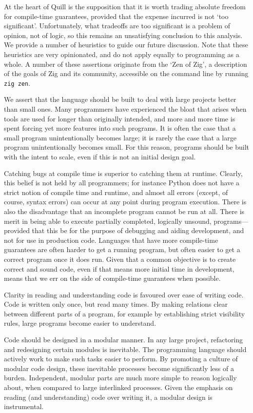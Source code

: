 \documentclass[UKenglish, 11pt, a4paper, parskip=half]{scrbook}
\newcommand{\code}[1]{\lstinline{#1}}
\theoremstyle{definition}
\begin{document}
At the heart of Quill is the supposition that it is worth trading absolute freedom for compile-time guarantees, provided that the expense incurred is not `too significant'.
Unfortunately, what tradeoffs are too significant is a problem of opinion, not of logic, so this remains an unsatisfying conclusion to this analysis.
We provide a number of heuristics to guide our future discussion.
Note that these heuristics are very opinionated, and do not apply equally to programming as a whole.
A number of these assertions originate from the `Zen of Zig', a description of the goals of Zig and its community, accessible on the command line by running \code{zig zen}.

We assert that the language should be built to deal with large projects better than small ones.
Many programmers have experienced the bloat that arises when tools are used for longer than originally intended, and more and more time is spent forcing yet more features into such programs.
It is often the case that a small program unintentionally becomes large; it is rarely the case that a large program unintentionally becomes small.
For this reason, programs should be built with the intent to scale, even if this is not an initial design goal.

Catching bugs at compile time is superior to catching them at runtime.
Clearly, this belief is not held by all programmers; for instance Python does not have a strict notion of compile time and runtime, and almost all errors (except, of course, syntax errors) can occur at any point during program execution.
There is also the disadvantage that an incomplete program cannot be run at all.
There is merit in being able to execute partially completed, logically unsound, programs---provided that this be for the purpose of debugging and aiding development, and not for use in production code.
Languages that have more compile-time guarantees are often harder to get a running program, but often easier to get a correct program once it does run.
Given that a common objective is to create correct and sound code, even if that means more initial time in development, means that we err on the side of compile-time guarantees when possible.

Clarity in reading and understanding code is favoured over ease of writing code.
Code is written only once, but read many times.
By making relations clear between different parts of a program, for example by establishing strict visibility rules, large programs become easier to understand.

Code should be designed in a modular manner.
In any large project, refactoring and redesigning certain modules is inevitable.
The programming language should actively work to make such tasks easier to perform.
By promoting a culture of modular code design, these inevitable processes become significantly less of a burden.
Independent, modular parts are much more simple to reason logically about, when compared to large interlinked processes.
Given the emphasis on reading (and understanding) code over writing it, a modular design is instrumental.
\end{document}
